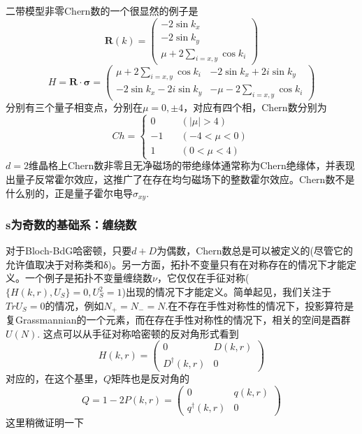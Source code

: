 \documentclass[a4paper]{article}
\numberwithin{equation}{subsection}
\begin{document}
二带模型非零Chern数的一个很显然的例子是
\begin{equation}
    \mathbf{R}(k)=\begin{pmatrix}
        -2\sin k_x\\
        -2\sin k_y\\
        \mu+2\sum_{i=x,y}\cos k_i
    \end{pmatrix}
\end{equation}
\begin{equation}
    H=\mathbf{R}\cdot \bm{\sigma}=\begin{pmatrix}
        \mu+2\sum_{i=x,y}\cos{k_i}&-2\sin k_x+2i\sin k_y\\
        -2\sin k_x-2i\sin k_y&-\mu-2\sum_{i=x,y}\cos k_i
    \end{pmatrix}
\end{equation}
分别有三个量子相变点，分别在$\mu=0,\pm 4$，对应有四个相，Chern数分别为
\begin{equation}
    Ch=\begin{cases}
        0\quad&(|\mu|>4)\\
        -1\quad&(-4<\mu<0)\\
        1\quad&(0<\mu<4)
    \end{cases}
\end{equation}
$d=2$维晶格上Chern数非零且无净磁场的带绝缘体通常称为Chern绝缘体，并表现出量子反常霍尔效应，这推广了在存在均匀磁场下的整数霍尔效应。Chern数不是什么别的，正是量子霍尔电导$\sigma_{xy}$.

\subsubsection{s为奇数的基础系：缠绕数}
对于Bloch-BdG哈密顿，只要$d+D$为偶数，Chern数总是可以被定义的(尽管它的允许值取决于对称类和δ)。另一方面，拓扑不变量只有在对称存在的情况下才能定义。一个例子是拓扑不变量缠绕数$\nu$，它仅仅在手征对称($\{H(k,r),U_S\}=0,U_S^2=1$)出现的情况下才能定义。简单起见，我们关注于$TrU_S=0$的情况，例如$N_+=N_-=N$.在不存在手性对称性的情况下，投影算符是复Grassmannian的一个元素，而在存在手性对称性的情况下，相关的空间是酉群$U(N)$. 这点可以从手征对称哈密顿的反对角形式看到
\begin{equation}
    H(k,r)=\begin{pmatrix}
        0&D(k,r)\\
        D^\dagger(k,r)&0
    \end{pmatrix}
\end{equation}
对应的，在这个基里，$Q$矩阵也是反对角的
\begin{equation}
    Q=1-2P(k,r)=\begin{pmatrix}
        0&q(k,r)\\
        q^\dagger(k,r)&0
    \end{pmatrix}
\end{equation}
这里稍微证明一下
\end{document}
